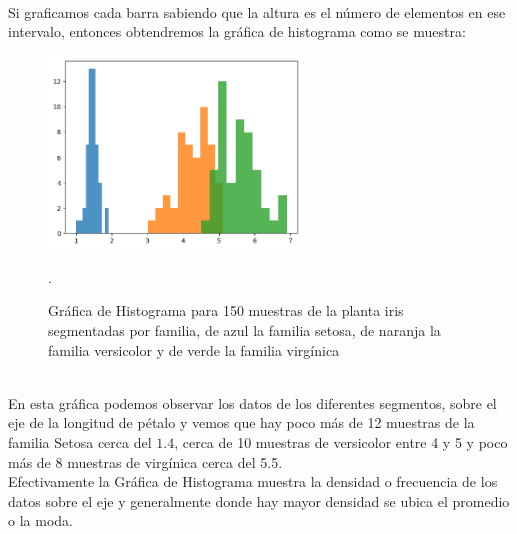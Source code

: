 \documentclass{article}
\begin{document}
\clearpage

\hfill\hfill\\
Si graficamos cada barra sabiendo que la altura es el número de elementos en ese intervalo, entonces obtendremos la gráfica de histograma como se muestra:
\begin{figure}[h]
    \centering
    \includegraphics[width=0.6\textwidth]{figures/hist1.png}
    \captionsetup{width=0.8\textwidth}
    \caption{Gráfica de Histograma para 150 muestras de la planta iris segmentadas por familia, de azul la familia setosa, de naranja la familia versicolor y de verde la familia virgínica}.
    \label{fig:hist1}
\end{figure}
\\
En esta gráfica podemos observar los datos de los diferentes segmentos, sobre el eje de la longitud de pétalo y vemos que hay poco más de 12 muestras de la familia Setosa cerca del $1.4$, cerca de 10 muestras de versicolor entre 4 y 5 y poco más de 8 muestras de virgínica cerca del 5.5.
\\[12pt]
Efectivamente la Gráfica de Histograma muestra la densidad o frecuencia de los datos sobre el eje y generalmente donde hay mayor densidad se ubica el promedio o la moda.

\clearpage
\end{document}
